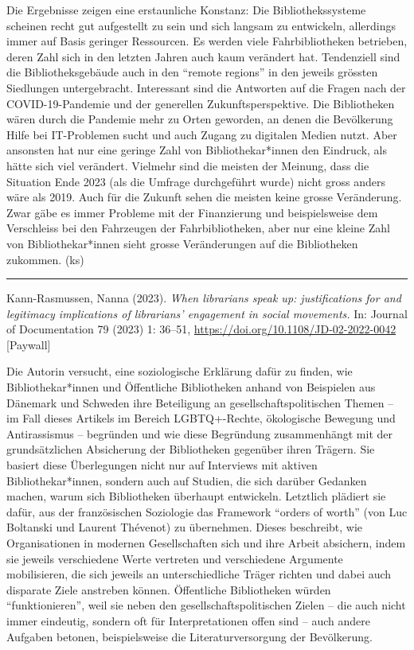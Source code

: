 \documentclass[a4paper,
fontsize=11pt,
oneside,
numbers=noperiodatend,
parskip=half-,
bibliography=totoc,
final
]{scrartcl}
\begin{document}
Die Ergebnisse zeigen eine erstaunliche Konstanz: Die Bibliothekssysteme
scheinen recht gut aufgestellt zu sein und sich langsam zu entwickeln,
allerdings immer auf Basis geringer Ressourcen. Es werden viele
Fahrbibliotheken betrieben, deren Zahl sich in den letzten Jahren auch
kaum verändert hat. Tendenziell sind die Bibliotheksgebäude auch in den
``remote regions'' in den jeweils grössten Siedlungen untergebracht.
Interessant sind die Antworten auf die Fragen nach der COVID-19-Pandemie
und der generellen Zukunftsperspektive. Die Bibliotheken wären durch die
Pandemie mehr zu Orten geworden, an denen die Bevölkerung Hilfe bei
IT-Problemen sucht und auch Zugang zu digitalen Medien nutzt. Aber
ansonsten hat nur eine geringe Zahl von Bibliothekar*innen den Eindruck,
als hätte sich viel verändert. Vielmehr sind die meisten der Meinung,
dass die Situation Ende 2023 (als die Umfrage durchgeführt wurde) nicht
gross anders wäre als 2019. Auch für die Zukunft sehen die meisten keine
grosse Veränderung. Zwar gäbe es immer Probleme mit der Finanzierung und
beispielsweise dem Verschleiss bei den Fahrzeugen der Fahrbibliotheken,
aber nur eine kleine Zahl von Bibliothekar*innen sieht grosse
Veränderungen auf die Bibliotheken zukommen. (ks)

\begin{center}\rule{0.5\linewidth}{0.5pt}\end{center}

Kann-Rasmussen, Nanna (2023). \emph{When librarians speak up:
justifications for and legitimacy implications of librarians' engagement
in social movements.} In: Journal of Documentation 79 (2023) 1: 36--51,
\url{https://doi.org/10.1108/JD-02-2022-0042} {[}Paywall{]}

Die Autorin versucht, eine soziologische Erklärung dafür zu finden, wie
Bibliothekar*innen und Öffentliche Bibliotheken anhand von Beispielen
aus Dänemark und Schweden ihre Beteiligung an gesellschaftspolitischen
Themen -- im Fall dieses Artikels im Bereich LGBTQ+-Rechte, ökologische
Bewegung und Antirassismus -- begründen und wie diese Begründung
zusammenhängt mit der grundsätzlichen Absicherung der Bibliotheken
gegenüber ihren Trägern. Sie basiert diese Überlegungen nicht nur auf
Interviews mit aktiven Bibliothekar*innen, sondern auch auf Studien, die
sich darüber Gedanken machen, warum sich Bibliotheken überhaupt
entwickeln. Letztlich plädiert sie dafür, aus der französischen
Soziologie das Framework ``orders of worth'' (von Luc Boltanski und
Laurent Thévenot) zu übernehmen. Dieses beschreibt, wie Organisationen
in modernen Gesellschaften sich und ihre Arbeit absichern, indem sie
jeweils verschiedene Werte vertreten und verschiedene Argumente
mobilisieren, die sich jeweils an unterschiedliche Träger richten und
dabei auch disparate Ziele anstreben können. Öffentliche Bibliotheken
würden ``funktionieren'', weil sie neben den gesellschaftspolitischen
Zielen -- die auch nicht immer eindeutig, sondern oft für
Interpretationen offen sind -- auch andere Aufgaben betonen,
beispielsweise die Literaturversorgung der Bevölkerung.
\end{document}
